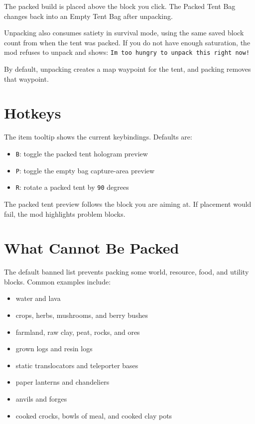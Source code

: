 \documentclass[
  11pt,
  letterpaper,
  titlepage]{article}
\providecommand{\tightlist}{%
  \setlength{\itemsep}{0pt}\setlength{\parskip}{0pt}}
\begin{document}
The packed build is placed above the block you click. The Packed Tent
Bag changes back into an Empty Tent Bag after unpacking.

Unpacking also consumes satiety in survival mode, using the same saved
block count from when the tent was packed. If you do not have enough
saturation, the mod refuses to unpack and shows:
\texttt{I\textquotesingle{}m\ too\ hungry\ to\ unpack\ this\ right\ now!}

By default, unpacking creates a map waypoint for the tent, and packing
removes that waypoint.

\section{Hotkeys}\label{hotkeys}

The item tooltip shows the current keybindings. Defaults are:

\begin{itemize}
\tightlist
\item
  \texttt{B}: toggle the packed tent hologram preview
\item
  \texttt{P}: toggle the empty bag capture-area preview
\item
  \texttt{R}: rotate a packed tent by \texttt{90} degrees
\end{itemize}

The packed tent preview follows the block you are aiming at. If
placement would fail, the mod highlights problem blocks.

\section{What Cannot Be Packed}\label{what-cannot-be-packed}

The default banned list prevents packing some world, resource, food, and
utility blocks. Common examples include:

\begin{itemize}
\tightlist
\item
  water and lava
\item
  crops, herbs, mushrooms, and berry bushes
\item
  farmland, raw clay, peat, rocks, and ores
\item
  grown logs and resin logs
\item
  static translocators and teleporter bases
\item
  paper lanterns and chandeliers
\item
  anvils and forges
\item
  cooked crocks, bowls of meal, and cooked clay pots
\end{itemize}
\end{document}
